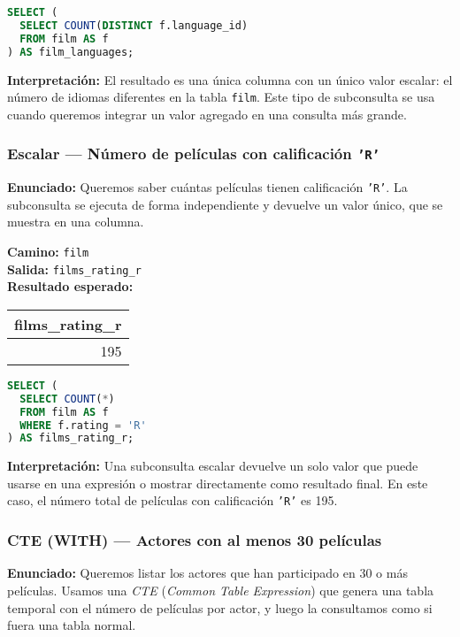 \documentclass[12pt,a4paper]{article}
\begin{document}
\begin{lstlisting}[language=SQL]
SELECT (
  SELECT COUNT(DISTINCT f.language_id)
  FROM film AS f
) AS film_languages;
\end{lstlisting}

\vspace{0.5em}
\textbf{Interpretación:}  
El resultado es una única columna con un único valor escalar: el número de idiomas diferentes en la tabla \texttt{film}.  
Este tipo de subconsulta se usa cuando queremos integrar un valor agregado en una consulta más grande.

\subsubsection*{Escalar — Número de películas con calificación \texttt{'R'}}
\textbf{Enunciado:}  
Queremos saber cuántas películas tienen calificación \texttt{'R'}.  
La subconsulta se ejecuta de forma independiente y devuelve un valor único, que se muestra en una columna.

\textbf{Camino:} \texttt{film}\\
\textbf{Salida:} \texttt{films\_rating\_r}\\

\textbf{Resultado esperado:}

\begin{center}
\begin{tabular}{r}
\toprule
\textbf{films\_rating\_r} \\
\midrule
195 \\
\bottomrule
\end{tabular}
\end{center}

\begin{lstlisting}[language=SQL]
SELECT (
  SELECT COUNT(*)
  FROM film AS f
  WHERE f.rating = 'R'
) AS films_rating_r;
\end{lstlisting}

\vspace{0.5em}
\textbf{Interpretación:}  
Una subconsulta escalar devuelve un solo valor que puede usarse en una expresión o mostrar directamente como resultado final.  
En este caso, el número total de películas con calificación \texttt{'R'} es 195.

\subsubsection*{CTE (WITH) — Actores con al menos 30 películas}
\textbf{Enunciado:}  
Queremos listar los actores que han participado en 30 o más películas.  
Usamos una \emph{CTE} (\textit{Common Table Expression}) que genera una tabla temporal con el número de películas por actor, 
y luego la consultamos como si fuera una tabla normal.
\end{document}
